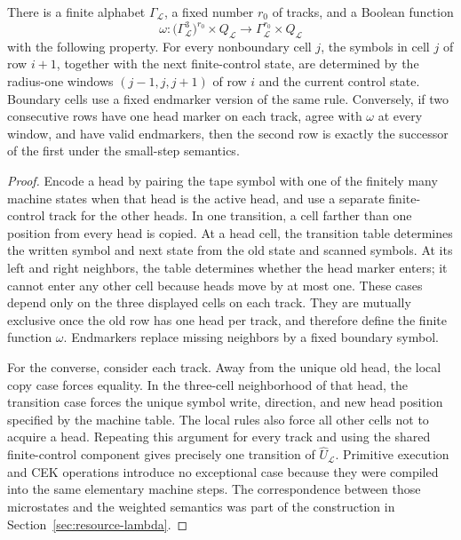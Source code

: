 \begin{lemma}
\label{lem:transition-window}\enspace%
There is a finite alphabet \(\Gamma_{\mathcal L}\), a fixed number \(r_0\) of
tracks, and a Boolean function
\[
 \omega:\bigl(\Gamma_{\mathcal L}^{3}\bigr)^{r_0}
       \times Q_{\mathcal L}\longrightarrow
       \Gamma_{\mathcal L}^{r_0}\times Q_{\mathcal L}
\]
with the following property.  For every nonboundary cell \(j\), the symbols in
cell \(j\) of row \(i+1\), together with the next finite-control state, are
determined by the radius-one windows
\((j-1,j,j+1)\) of row \(i\) and the current control state.  Boundary cells use
a fixed endmarker version of the same rule.  Conversely, if two consecutive
rows have one head marker on each track, agree with \(\omega\) at every window,
and have valid endmarkers, then the second row is exactly the successor of the
first under the small-step semantics.
\end{lemma}

\begin{proof}
Encode a head by pairing the tape symbol with one of the finitely many machine
states when that head is the active head, and use a separate finite-control
track for the other heads.  In one transition, a cell farther than one position
from every head is copied.  At a head cell, the transition table determines the
written symbol and next state from the old state and scanned symbols.  At its
left and right neighbors, the table determines whether the head marker enters;
it cannot enter any other cell because heads move by at most one.  These cases
depend only on the three displayed cells on each track.  They are mutually
exclusive once the old row has one head per track, and therefore define the
finite function \(\omega\).  Endmarkers replace missing neighbors by a fixed
boundary symbol.

For the converse, consider each track.  Away from the unique old head, the
local copy case forces equality.  In the three-cell neighborhood of that head,
the transition case forces the unique symbol write, direction, and new head
position specified by the machine table.  The local rules also force all other
cells not to acquire a head.  Repeating this argument for every track and
using the shared finite-control component gives precisely one transition of
\(\widehat U_{\mathcal L}\).  Primitive execution and CEK operations introduce
no exceptional case because they were compiled into the same elementary
machine steps.  The correspondence between those microstates and the weighted
semantics was part of the construction in Section~\ref{sec:resource-lambda}.
\end{proof}

